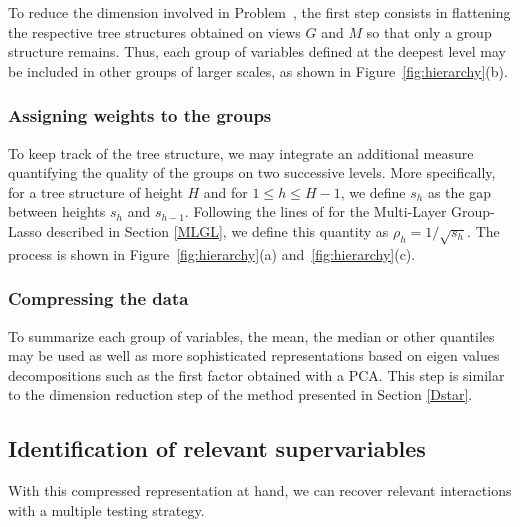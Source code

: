\documentclass[]{book}
\begin{document}
To reduce the dimension involved in Problem~, the first step consists in
flattening the respective tree structures obtained on views \(\mathit{G}\) and
\(\mathit{M}\) so that only a group structure remains. Thus, each group of
variables defined at the deepest level may be included in other groups
of larger scales, as shown in Figure~\ref{fig:hierarchy}(b).

\hypertarget{assigning-weights-to-the-groups}{%
\subsubsection*{Assigning weights to the groups}\label{assigning-weights-to-the-groups}}

To keep track of the tree structure, we may integrate an additional
measure quantifying the quality of the groups on two successive levels.
More specifically, for a tree structure of height \(H\) and for
\(1 \leq h \leq H-1\), we define \(s_h\) as the gap between heights \(s_h\)
and \(s_{h-1}\). Following the lines of \citep{grimonprez_selection_2016} for
the Multi-Layer Group-Lasso described in Section \ref{MLGL}, we
define this quantity as \(\displaystyle{\rho_h = 1 / \sqrt{s_h}}\). The
process is shown in Figure~\ref{fig:hierarchy}(a) and~\ref{fig:hierarchy}(c).

\hypertarget{compressing-the-data}{%
\subsubsection*{Compressing the data}\label{compressing-the-data}}

To summarize each group of variables, the mean, the median or other
quantiles may be used as well as more sophisticated representations
based on eigen values decompositions such as the first factor obtained
with a PCA. This step is similar to the dimension reduction step of the
method presented in Section \ref{Dstar}.

\hypertarget{identification-of-relevant-supervariables}{%
\subsection{Identification of relevant supervariables}\label{identification-of-relevant-supervariables}}

With this compressed representation at hand, we can recover relevant
interactions with a multiple testing strategy.
\end{document}
